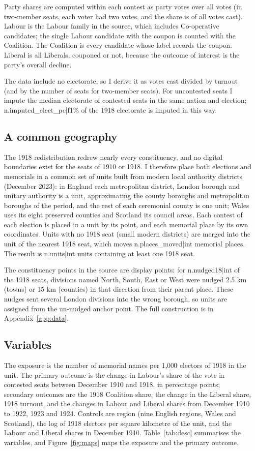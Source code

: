 \documentclass[11pt,a4paper]{article}
\begin{document}
Party shares are computed within each contest as party votes over all votes (in two-member seats, each voter had two votes, and the share is of all votes cast). Labour is the Labour family in the source, which includes Co-operative candidates; the single Labour candidate with the coupon is counted with the Coalition. The Coalition is every candidate whose label records the coupon. Liberal is all Liberals, couponed or not, because the outcome of interest is the party's overall decline.

The data include no electorate, so I derive it as votes cast divided by turnout (and by the number of seats for two-member seats). For uncontested seats I impute the median electorate of contested seats in the same nation and election; {{n.imputed_elect_pc|f1}}\% of the 1918 electorate is imputed in this way.

\subsection{A common geography}
The 1918 redistribution redrew nearly every constituency, and no digital boundaries exist for the seats of 1910 or 1918. I therefore place both elections and memorials in a common set of units built from modern local authority districts (December 2023): in England each metropolitan district, London borough and unitary authority is a unit, approximating the county boroughs and metropolitan boroughs of the period, and the rest of each ceremonial county is one unit; Wales uses its eight preserved counties and Scotland its council areas. Each contest of each election is placed in a unit by its point, and each memorial place by its own coordinates. Units with no 1918 seat (small modern districts) are merged into the unit of the nearest 1918 seat, which moves {{n.places_moved|int}} memorial places. The result is {{n.units|int}} units containing at least one 1918 seat.

The constituency points in the source are display points: for {{n.nudged18|int}} of the 1918 seats, divisions named North, South, East or West were nudged 2.5 km (towns) or 15 km (counties) in that direction from their parent place. These nudges sent several London divisions into the wrong borough, so units are assigned from the un-nudged anchor point. The full construction is in Appendix~\ref{app:data}.

\subsection{Variables}
The exposure is the number of memorial names per 1,000 electors of 1918 in the unit. The primary outcome is the change in Labour's share of the vote in contested seats between December 1910 and 1918, in percentage points; secondary outcomes are the 1918 Coalition share, the change in the Liberal share, 1918 turnout, and the changes in Labour and Liberal shares from December 1910 to 1922, 1923 and 1924. Controls are region (nine English regions, Wales and Scotland), the log of 1918 electors per square kilometre of the unit, and the Labour and Liberal shares in December 1910. Table~\ref{tab:desc} summarises the variables, and Figure~\ref{fig:maps} maps the exposure and the primary outcome.
\end{document}

